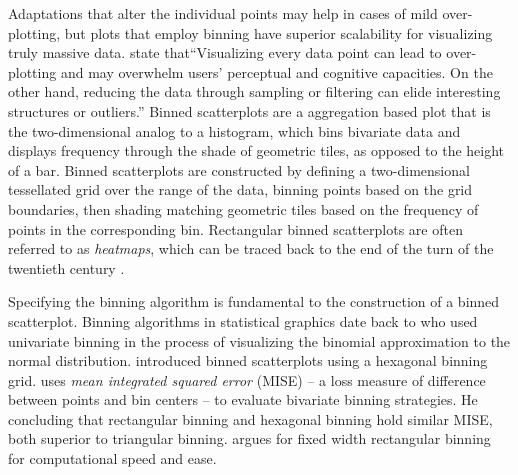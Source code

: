 Adaptations that alter the individual points may help in cases of mild over-plotting, but plots that employ binning have superior scalability for visualizing truly massive data. \citet{Liu2013imMens} state that``Visualizing every data point can lead to over-plotting and may overwhelm users' perceptual and cognitive capacities. On the other hand, reducing the data through sampling or filtering can elide interesting structures or outliers.'' Binned scatterplots are a aggregation based plot that is the two-dimensional analog to a histogram, which bins bivariate data and displays frequency through the shade of geometric tiles, as opposed to the height of a bar. Binned scatterplots are constructed by defining a two-dimensional tessellated grid over the range of the data, binning points based on the grid boundaries, then shading matching geometric tiles based on the frequency of points in the corresponding bin. Rectangular binned scatterplots are often referred to as \textit{heatmaps}, which can be traced back to the end of the turn of the twentieth century \citep{Wilkinson2000}.

Specifying the binning algorithm is fundamental to the construction of a binned scatterplot. Binning algorithms in statistical graphics date back to \citet{Pearson1895} who used univariate binning in the process of visualizing the binomial approximation to the normal distribution.  \citet{Carr1987} introduced binned scatterplots using a hexagonal binning grid. \citet{scott1992} uses \textit{mean integrated squared error} (MISE) -- a loss measure of difference between points and bin centers -- to evaluate bivariate binning strategies. He concluding that rectangular binning and hexagonal binning hold similar MISE, both superior to triangular binning. \citet{Wickham2013Bin} argues for fixed width rectangular binning for computational speed and ease. 


